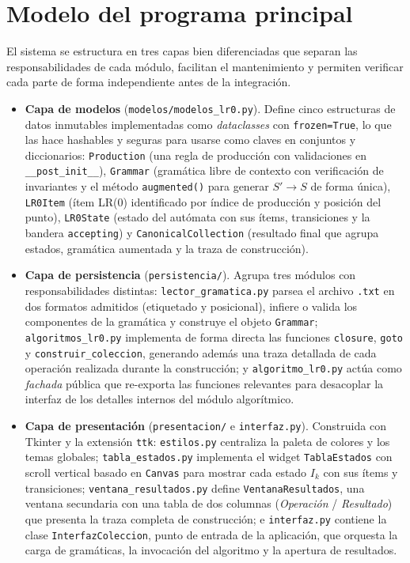 \section{Modelo del programa principal}

El sistema se estructura en tres capas bien diferenciadas que separan las responsabilidades
de cada módulo, facilitan el mantenimiento y permiten verificar cada parte de forma
independiente antes de la integración.

\begin{itemize}
  \item \textbf{Capa de modelos} (\texttt{modelos/modelos\_lr0.py}).
    Define cinco estructuras de datos inmutables implementadas como
    \textit{dataclasses} con \texttt{frozen=True}, lo que las hace hashables y seguras
    para usarse como claves en conjuntos y diccionarios:
    \texttt{Production} (una regla de producción con validaciones en \texttt{\_\_post\_init\_\_}),
    \texttt{Grammar} (gramática libre de contexto con verificación de invariantes y el método
    \texttt{augmented()} para generar $S' \to S$ de forma única),
    \texttt{LR0Item} (ítem LR(0) identificado por índice de producción y posición del punto),
    \texttt{LR0State} (estado del autómata con sus ítems, transiciones y la bandera
    \texttt{accepting}) y \texttt{CanonicalCollection} (resultado final que agrupa estados,
    gramática aumentada y la traza de construcción).

  \item \textbf{Capa de persistencia} (\texttt{persistencia/}).
    Agrupa tres módulos con responsabilidades distintas:
    \texttt{lector\_gramatica.py} parsea el archivo \texttt{.txt} en dos formatos admitidos
    (etiquetado y posicional), infiere o valida los componentes de la gramática y construye
    el objeto \texttt{Grammar};
    \texttt{algoritmos\_lr0.py} implementa de forma directa las funciones
    \texttt{closure}, \texttt{goto} y \texttt{construir\_coleccion}, generando además una
    traza detallada de cada operación realizada durante la construcción; y
    \texttt{algoritmo\_lr0.py} actúa como \textit{fachada} pública que re-exporta las
    funciones relevantes para desacoplar la interfaz de los detalles internos del módulo
    algorítmico.

  \item \textbf{Capa de presentación} (\texttt{presentacion/} e \texttt{interfaz.py}).
    Construida con Tkinter y la extensión \texttt{ttk}:
    \texttt{estilos.py} centraliza la paleta de colores y los temas globales;
    \texttt{tabla\_estados.py} implementa el widget \texttt{TablaEstados} con scroll
    vertical basado en \texttt{Canvas} para mostrar cada estado $I_k$ con sus ítems y
    transiciones;
    \texttt{ventana\_resultados.py} define \texttt{VentanaResultados}, una ventana
    secundaria con una tabla de dos columnas (\textit{Operación} / \textit{Resultado})
    que presenta la traza completa de construcción; e
    \texttt{interfaz.py} contiene la clase \texttt{InterfazColeccion}, punto de entrada
    de la aplicación, que orquesta la carga de gramáticas, la invocación del algoritmo
    y la apertura de resultados.
\end{itemize}


